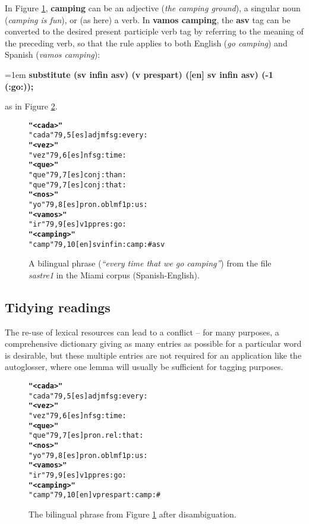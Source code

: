 \documentclass[11pt]{article}
\begin{document}
In Figure \ref{camping}, \textbf{camping} can be an adjective (\textit{the camping ground}), a singular noun (\textit{camping is fun}), or (as here) a verb.  In \textbf{vamos camping}, the \textbf{asv} tag can be converted to the desired present participle verb tag by referring to the meaning of the preceding verb, so that the rule applies to both English (\textit{go camping}) and Spanish (\textit{vamos camping}):

\noindent
\hangindent=1em
\textbf{substitute (sv infin asv) (v prespart) ([en] sv infin asv) (-1 (:go:));}

\noindent as in Figure \ref{camping1}.

\begin{figure}[!hbtp]
\centering
\begin{footnotesize}
\begin{alltt}
\normalfont
\textbf{"<cada>"}
    "cada"  {79,5} [es] adj mf sg :every:
\textbf{"<vez>"}
    "vez"  {79,6} [es] n f sg :time:
\textbf{"<que>"}
    "que"  {79,7} [es] conj :than:
    "que"  {79,7} [es] conj :that:
\textbf{"<nos>"}
    "yo"  {79,8} [es] pron.obl mf 1p :us:
\textbf{"<vamos>"}
    "ir"  {79,9} [es] v 1p pres :go:
\textbf{"<camping>"}
    "camp"  {79,10} [en] sv infin :camp: # asv
\end{alltt}
\end{footnotesize}
\caption{A bilingual phrase (\textit{``every time that we go camping''}) from the file \textit{sastre1} in the Miami corpus (Spanish-English).}
\label{camping}
\end{figure}


\subsection{Tidying readings}
\label{sec:tidying}


The re-use of lexical resources can lead to a conflict -- for many purposes, a comprehensive dictionary giving as many entries as possible for a particular word is desirable, but these multiple entries are not required for an application like the autoglosser, where one lemma will usually be sufficient for tagging purposes.

\begin{figure}[!hbtp]
\centering
\begin{footnotesize}
\begin{alltt}
\normalfont
\textbf{"<cada>"}
    "cada" {79,5} [es] adj mf sg :every:
\textbf{"<vez>"}
    "vez" {79,6} [es] n f sg :time:
\textbf{"<que>"}
    "que" {79,7} [es] pron.rel :that:
\textbf{"<nos>"}
    "yo" {79,8} [es] pron.obl mf 1p :us:
\textbf{"<vamos>"}
    "ir" {79,9} [es] v 1p pres :go:
\textbf{"<camping>"}
    "camp" {79,10} [en] v prespart :camp: #
\end{alltt}
\end{footnotesize}
\caption{The bilingual phrase from Figure \ref{camping} after disambiguation.}
\label{camping1}
\end{figure}
\end{document}
